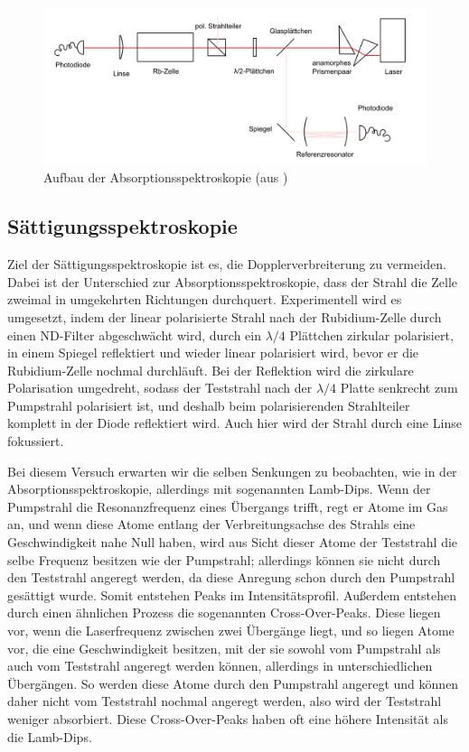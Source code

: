 \documentclass[a4paper,parskip]{scrartcl}
\begin{document}
\begin{figure}[h]
\centering
\includegraphics[width=\textwidth]{Aufbau_1.png}
\caption{Aufbau der Absorptionsspektroskopie  (aus \cite{Ref:3})}
\end{figure}

\subsection{Sättigungsspektroskopie}

Ziel der Sättigungsspektroskopie ist es, die Dopplerverbreiterung zu vermeiden. Dabei ist der Unterschied zur Absorptionsspektroskopie, dass der Strahl die Zelle zweimal in umgekehrten Richtungen durchquert. Experimentell wird es umgesetzt, indem der linear polarisierte Strahl nach der Rubidium-Zelle durch einen ND-Filter abgeschwächt wird, durch ein $\lambda/4$ Plättchen zirkular polarisiert, in einem Spiegel reflektiert und wieder linear polarisiert wird, bevor er die Rubidium-Zelle nochmal durchläuft. Bei der Reflektion wird die zirkulare Polarisation umgedreht, sodass der Teststrahl nach der $\lambda/4$ Platte senkrecht zum Pumpstrahl polarisiert ist, und deshalb beim polarisierenden Strahlteiler komplett in der Diode reflektiert wird. Auch hier wird der Strahl durch eine Linse fokussiert.

Bei diesem Versuch erwarten wir die selben Senkungen zu beobachten, wie in der Absorptionsspektroskopie, allerdings mit sogenannten Lamb-Dips. Wenn der Pumpstrahl die Resonanzfrequenz eines Übergangs trifft, regt er Atome im Gas an, und wenn diese Atome entlang der Verbreitungsachse des Strahls eine Geschwindigkeit nahe Null haben, wird aus Sicht dieser Atome der Teststrahl die selbe Frequenz besitzen wie der Pumpstrahl; allerdings können sie nicht durch den Teststrahl angeregt werden, da diese Anregung schon durch den Pumpstrahl gesättigt wurde. Somit entstehen Peaks im Intensitätsprofil. Außerdem entstehen durch einen ähnlichen Prozess die sogenannten Cross-Over-Peaks. Diese liegen vor, wenn die Laserfrequenz zwischen zwei Übergänge liegt, und so liegen Atome vor, die eine Geschwindigkeit besitzen, mit der sie sowohl vom Pumpstrahl als auch vom Teststrahl angeregt werden können, allerdings in unterschiedlichen Übergängen. So werden diese Atome durch den Pumpstrahl angeregt und können daher nicht vom Teststrahl nochmal angeregt werden, also wird der Teststrahl weniger absorbiert. Diese Cross-Over-Peaks haben oft eine höhere Intensität als die Lamb-Dips.
\end{document}
